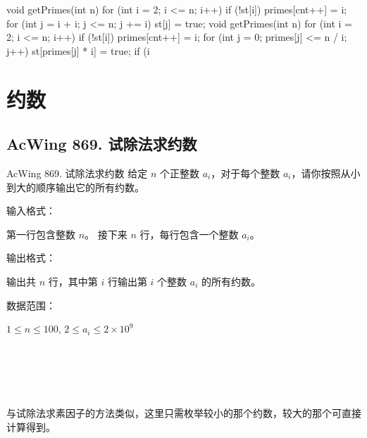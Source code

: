 \begin{mycpptwocol}[埃氏筛法和线性筛法]
    void getPrimes(int n) {
        for (int i = 2; i <= n; i++) {
            if (!st[i]) {
                primes[cnt++] = i;
                for (int j = i + i; j <= n; j += i) {
                    st[j] = true;
                }
            }
        }
    }
    void getPrimes(int n) {
        for (int i = 2; i <= n; i++) {
            if (!st[i]) primes[cnt++] = i;
            for (int j = 0; primes[j] <= n / i; j++) {
                st[primes[j] * i] = true;
                if (i %
            }
        }
    }
\end{mycpptwocol}


\section{约数}

\subsection{AcWing 869. 试除法求约数}
\begin{titledbox}{AcWing 869. 试除法求约数}
    给定 $n$ 个正整数 $a_i$，对于每个整数 $a_i$，请你按照从小到大的顺序输出它的所有约数。

    输入格式：

    第一行包含整数 $n$。 接下来 $n$ 行，每行包含一个整数 $a_i$。

    输出格式：

    输出共 $n$ 行，其中第 $i$ 行输出第 $i$ 个整数 $a_i$ 的所有约数。

    数据范围：

    $1 \le n \le 100$, $2 \le a_i \le 2 \times 10^9$

    \begin{inputblock}
         \\
         \\
    \end{inputblock}
    \begin{outputblock}
         \\
    \end{outputblock}
\end{titledbox}

与试除法求素因子的方法类似，这里只需枚举较小的那个约数，较大的那个可直接计算得到。

